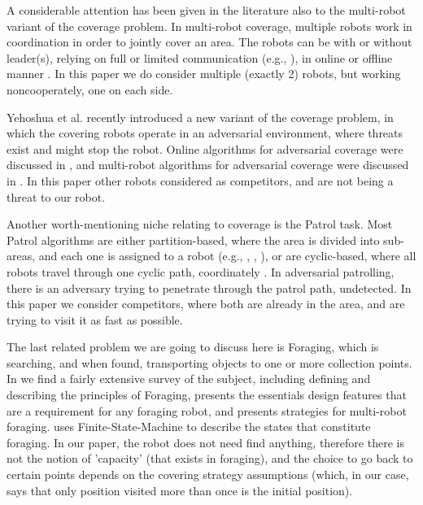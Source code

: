 \documentclass[a4paper,10pt]{article}
\begin{document}
A considerable attention has been given in the literature also to the multi-robot variant of the coverage problem. In multi-robot coverage, multiple robots work in coordination in order to jointly cover an area. The robots can be with or without leader(s), relying on full or limited communication (e.g., \cite{agmon2008giving}), in online or offline manner \cite{agmon2008giving, de2005blind}.
In this paper we do consider multiple (exactly 2) robots, but working noncooperately, one on each side.

Yehoshua et al. \cite{yehoshua2013robotic} recently introduced a new variant of the coverage problem, in which the covering robots operate in an adversarial environment, where threats exist and might stop the robot. Online algorithms for adversarial coverage were discussed in  \cite{yehoshua2015online}, and multi-robot algorithms for adversarial coverage were discussed in \cite{yehoshua2016multi}.
In this paper other robots considered as competitors, and are not being a threat to our robot. %

Another worth-mentioning niche relating to coverage is the Patrol task. %
Most Patrol algorithms are either partition-based, where the area is divided into sub-areas, and each one is assigned to a robot (e.g., \cite{guo2004towards}, \cite{guo2004coverage}, \cite{jung2002tracking}), or are cyclic-based, where all robots travel through one cyclic path, coordinately \cite{chevaleyre2004theoretical}. 
In adversarial patrolling, there is an adversary trying to penetrate through the patrol path, undetected. In this paper we consider competitors, where both are already in the area, and are trying to visit it as fast as possible. %

The last related problem we are going to discuss here is Foraging, which is searching, and when found, transporting objects to one or more collection points. In \cite{winfield2009foraging} we find a fairly extensive survey of the subject, including defining and describing the principles of Foraging, presents the essentials design features that are a requirement for any foraging robot, and presents strategies for multi-robot foraging. \cite{winfield2009foraging} uses Finite-State-Machine to describe the states that constitute foraging. In our paper, the robot does not need find anything, therefore there is not the notion of 'capacity' (that exists in foraging), and the choice to go back to certain points depends on the covering strategy assumptions (which, in our case, says that only position visited more than once is the initial position).
\end{document}
